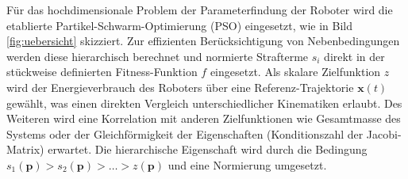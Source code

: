 \documentclass[fleqn,a4paper,10pt]{article}
\newcommand{\bm}[1]{\mathbf{#1}}
\renewenvironment{figure}
  {\par\vspace{6pt}\noindent\minipage{\linewidth}}
  {\endminipage\par\vspace{6pt}}
\begin{document}
Für das hochdimensionale Problem der Parameterfindung der Roboter wird die etablierte Partikel-Schwarm-Optimierung (PSO) eingesetzt, wie in Bild\,\ref{fig:uebersicht} skizziert.
Zur effizienten Berücksichtigung von Nebenbedingungen werden diese hierarchisch berechnet und normierte Strafterme $s_i$ direkt in der stückweise definierten Fitness-Funktion $f$ eingesetzt.
Als skalare Zielfunktion $z$ wird der Energieverbrauch des Roboters über eine Referenz-Trajektorie $\bm{x}(t)$ gewählt, was einen direkten Vergleich unterschiedlicher Kinematiken erlaubt.
Des Weiteren wird eine Korrelation mit anderen Zielfunktionen wie Gesamtmasse des Systems oder der Gleichförmigkeit der Eigenschaften (Konditionszahl der Jacobi-Matrix) erwartet.
Die hierarchische Eigenschaft wird durch die Bedingung $s_1(\bm{p})>s_2(\bm{p})>\dots>z(\bm{p})$ und eine Normierung umgesetzt.

\begin{figure}
	\centering
    
    \label{fig:uebersicht}
\end{figure}

\end{document}
